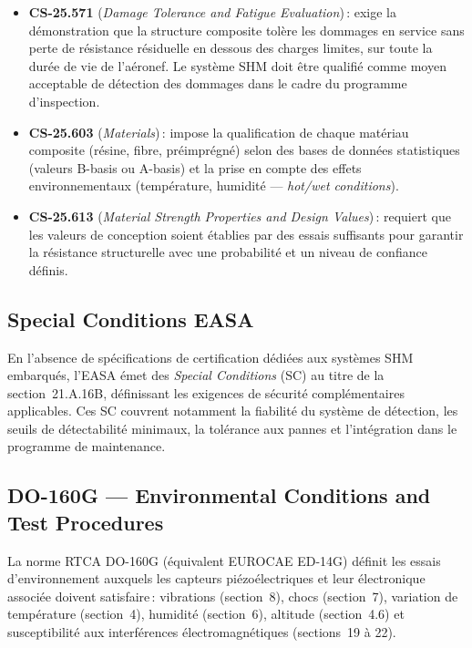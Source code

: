 \documentclass[12pt,a4paper]{article}
\begin{document}
\begin{itemize}[nosep]
    \item \textbf{CS-25.571} (\textit{Damage Tolerance and Fatigue Evaluation})\,: exige la démonstration que la structure composite tolère les dommages en service sans perte de résistance résiduelle en dessous des charges limites, sur toute la durée de vie de l'aéronef. Le système SHM doit être qualifié comme moyen acceptable de détection des dommages dans le cadre du programme d'inspection.
    \item \textbf{CS-25.603} (\textit{Materials})\,: impose la qualification de chaque matériau composite (résine, fibre, préimprégné) selon des bases de données statistiques (valeurs B-basis ou A-basis) et la prise en compte des effets environnementaux (température, humidité --- \textit{hot/wet conditions}).
    \item \textbf{CS-25.613} (\textit{Material Strength Properties and Design Values})\,: requiert que les valeurs de conception soient établies par des essais suffisants pour garantir la résistance structurelle avec une probabilité et un niveau de confiance définis.
\end{itemize}

\subsection{Special Conditions EASA}

En l'absence de spécifications de certification dédiées aux systèmes SHM embarqués, l'EASA émet des \textit{Special Conditions} (SC) au titre de la section~21.A.16B, définissant les exigences de sécurité complémentaires applicables. Ces SC couvrent notamment la fiabilité du système de détection, les seuils de détectabilité minimaux, la tolérance aux pannes et l'intégration dans le programme de maintenance.

\subsection{DO-160G --- Environmental Conditions and Test Procedures}

La norme RTCA DO-160G (équivalent EUROCAE ED-14G) définit les essais d'environnement auxquels les capteurs piézoélectriques et leur électronique associée doivent satisfaire\,: vibrations (section~8), chocs (section~7), variation de température (section~4), humidité (section~6), altitude (section~4.6) et susceptibilité aux interférences électromagnétiques (sections~19 à 22).
\end{document}
